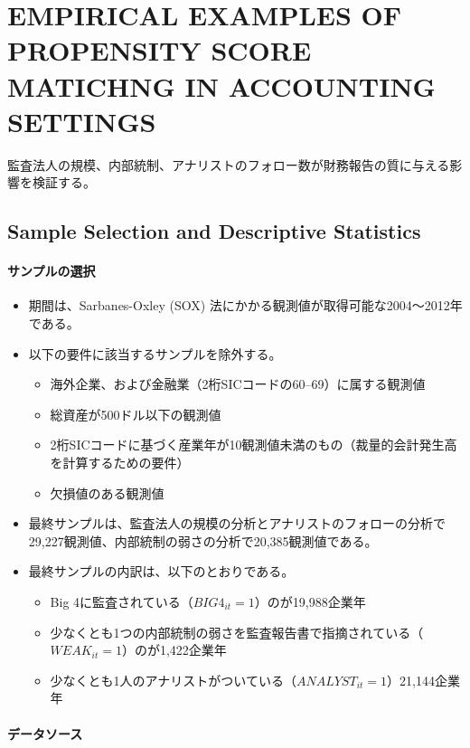 \section{EMPIRICAL EXAMPLES OF PROPENSITY SCORE MATICHNG IN ACCOUNTING SETTINGS}
監査法人の規模、内部統制、アナリストのフォロー数が財務報告の質に与える影響を検証する。

\subsection*{Sample Selection and Descriptive Statistics}

\paragraph{サンプルの選択}

\begin{itemize}
 \item 期間は、Sarbanes-Oxley (SOX) 法にかかる観測値が取得可能な2004〜2012年である。
 \item 以下の要件に該当するサンプルを除外する。
   \begin{itemize}
    \item 海外企業、および金融業（2桁SICコードの60--69）に属する観測値
    \item 総資産が500ドル以下の観測値
    \item 2桁SICコードに基づく産業年が10観測値未満のもの（裁量的会計発生高を計算するための要件）
    \item 欠損値のある観測値
   \end{itemize}
 \item 最終サンプルは、監査法人の規模の分析とアナリストのフォローの分析で29,227観測値、内部統制の弱さの分析で20,385観測値である。
 \item 最終サンプルの内訳は、以下のとおりである。
    \begin{itemize}
    \item Big 4に監査されている（$\mathit{BIG}4_{it}=1$）のが19,988企業年
    \item 少なくとも1つの内部統制の弱さを監査報告書で指摘されている（$\mathit{WEAK}_{it}=1$）のが1,422企業年
    \item 少なくとも1人のアナリストがついている（$\mathit{ANALYST}_{it}=1$）21,144企業年
   \end{itemize}
\end{itemize}

\paragraph{データソース}

